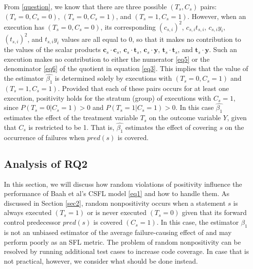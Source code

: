 From \ref{question}, we know that there are three possible $(T_s,C_s)$ pairs:
$(T_s=0,C_s=0)$, $(T_s=0,C_s=1)$, and $(T_s=1,C_s=1)$.  
However, when an execution has $(T_s=0,C_s=0)$, its corresponding $(c_{s,i})^2$, 
$c_{s,i}t_{s,i}$, $c_{s,i}y_i$, $(t_{s,i})^2$, and $t_{s,i}y_i$ values are all equal to 0, 
so that it makes no contribution to the values of the scalar products $\mathbf{c}_s\cdot\mathbf{c}_s$,
$\mathbf{c}_s\cdot\mathbf{t}_s$, $\mathbf{c}_s\cdot\mathbf{y}$, $\mathbf{t}_s\cdot\mathbf{t}_s$, 
and $\mathbf{t}_s\cdot\mathbf{y}$.  Such an execution makes no contribution to either the numerator \eqref{eq5} or the denominator \eqref{eq6} of the quotient in equation \eqref{eq3}.  
This implies that the value of the estimator $\hat{\beta_1}$ is determined solely by executions with
$(T_s=0,C_s=1)$ and $(T_s=1,C_s=1)$.  Provided that each of these pairs occurs for at least one execution, 
positivity holds for the stratum (group) of executions with $C_s=1$, since 
$P(T_s=0|C_s=1)>0$ and $P(T_s=1|C_s=1)>0$.  In this case $\hat{\beta_1}$ estimates the effect of the 
treatment variable $T_s$ on the outcome variable $Y$, given that $C_s$ is restricted to be 1.  
That is, $\hat{\beta_1}$ estimates the effect of covering $s$ on the occurrence of failures 
when $pred(s)$ is covered.


\subsection{Analysis of RQ2}\label{sec3.2}

In this section, we will discuss how random violations of positivity influence the performance of 
Baah et al’s CSFL model \eqref{eq1} and how to handle them.  As discussed in Section \ref{sec2}, 
random nonpositivity occurs when a statement $s$ is always executed $(T_s=1)$ or is never 
executed $(T_s=0)$ given that its forward control predecessor $pred(s)$ is covered $(C_s=1)$.  
In this case, the estimator $\hat{\beta_1}$ is not an unbiased estimator of the average 
failure-causing effect of  and may perform poorly as an SFL metric.  
The problem of random nonpositivity can be resolved by running additional test cases to increase code coverage.   
In case that is not practical, however, we consider what should be done instead.

